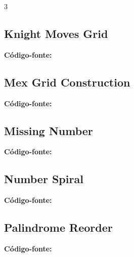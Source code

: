 \documentclass[8pt]{extarticle}
\begin{document}
\begin{multicols*}{3}
\subsection{Knight Moves Grid}
\begin{caixaenunciado}

\end{caixaenunciado}
\vspace{0.3cm}
\noindent\textbf{Código-fonte:}


\subsection{Mex Grid Construction}
\begin{caixaenunciado}

\end{caixaenunciado}
\vspace{0.3cm}
\noindent\textbf{Código-fonte:}


\subsection{Missing Number}
\begin{caixaenunciado}

\end{caixaenunciado}
\vspace{0.3cm}
\noindent\textbf{Código-fonte:}


\subsection{Number Spiral}
\begin{caixaenunciado}

\end{caixaenunciado}
\vspace{0.3cm}
\noindent\textbf{Código-fonte:}


\subsection{Palindrome Reorder}
\begin{caixaenunciado}

\end{caixaenunciado}
\vspace{0.3cm}
\noindent\textbf{Código-fonte:}



\end{multicols*}
\end{document}
